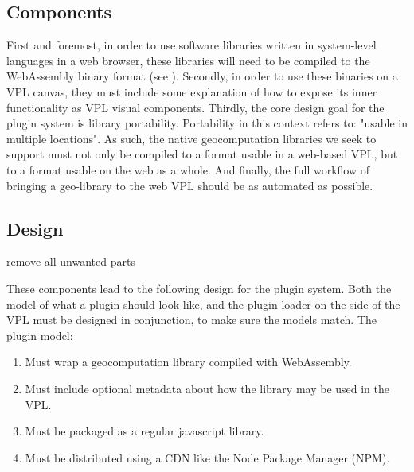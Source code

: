 
\subsection{Components}

First and foremost, in order to use software libraries written in system-level languages in a web browser, these libraries will need to be compiled to the WebAssembly binary format (see ). 
Secondly, in order to use these binaries on a VPL canvas, they must include some explanation of how to expose its inner functionality as VPL visual components.
Thirdly, the core design goal for the plugin system is library portability.
Portability in this context refers to: "usable in multiple locations".
As such, the native geocomputation libraries we seek to support must not only be compiled to a format usable in a web-based VPL, but to a format usable on the web as a whole. 
And finally, the full workflow of bringing a geo-library to the web VPL should be as automated as possible. 

\newpage
\subsection{Design}

\begin{note}
  remove all unwanted parts
\end{note}

These components lead to the following design for the plugin system.
Both the model of what a plugin should look like, and the plugin loader on the side of the VPL must be designed in conjunction, to make sure the models match.  
The plugin model:
\begin{enumerate}[-]
  \item Must wrap a geocomputation library compiled with WebAssembly.
  \item Must include optional metadata about how the library may be used in the VPL.
  \item Must be packaged as a regular javascript library.
  \item Must be distributed using a \ac{CDN} like the Node Package Manager (NPM).
\end{enumerate}

